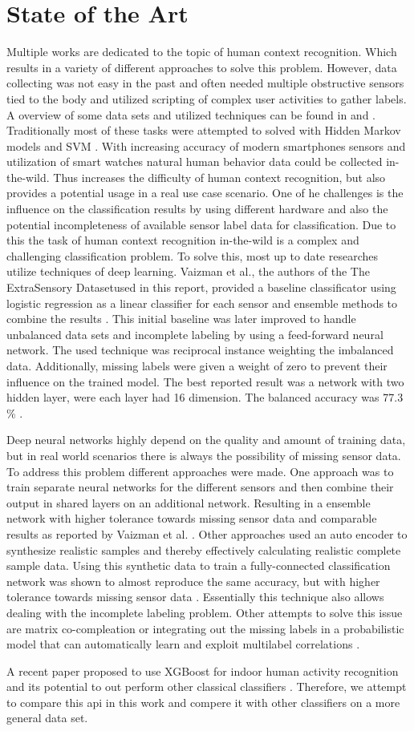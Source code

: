 \section{State of the Art}
Multiple works are dedicated to the topic of human context recognition. Which results in a variety of different approaches to solve this problem. However, data collecting was not easy in the past and often needed multiple obstructive sensors tied to the body and utilized scripting of complex user activities to gather labels. A overview of some data sets and utilized techniques can be found in \cite{Ramasamy18} and \cite{Lara13}. Traditionally most of these tasks were attempted to solved with Hidden Markov models \cite{Lee11} and SVM \cite{Anguita12}. 
With increasing accuracy of modern smartphones sensors and utilization of smart watches natural human behavior data could be collected in-the-wild. Thus increases the difficulty of human context recognition, but also provides a potential usage in a real use case scenario.  One of he challenges is the influence on the classification results by using different hardware \cite{Stisen15} and also the potential incompleteness of available sensor label data for classification. Due to this the task of human context recognition in-the-wild is a complex and challenging classification problem. 
To solve this, most up to date researches utilize techniques of deep learning. Vaizman et al., the authors of the \gl The ExtraSensory Dataset\gr  used in this report, provided a baseline classificator using logistic regression as a linear classifier for each sensor and ensemble methods to combine the results \cite{Vaizman17}. This initial baseline was later improved to handle unbalanced data sets and incomplete labeling by using a feed-forward neural network. The used technique was reciprocal instance weighting the imbalanced data. Additionally, missing labels were given a weight of zero to prevent their influence on the trained model. The best reported result was a network with two hidden layer, were each layer had 16 dimension. The balanced accuracy was 77.3 \% \cite{Vaizman18}. 

Deep neural networks highly depend on the quality and amount of training data, but in real world scenarios there is always the possibility of missing sensor data. To address this problem different approaches were made. One approach was to train separate neural networks for the different sensors and then combine their output in shared layers on an additional network. Resulting in a ensemble network with higher tolerance towards missing sensor data and comparable results as reported by Vaizman et al. \cite{Saeed18}. Other approaches used an auto encoder to synthesize realistic samples and thereby effectively calculating realistic complete sample data. Using this synthetic data to train a fully-connected classification network was shown to almost reproduce the same accuracy, but with higher tolerance towards missing sensor data \cite{Saeed18-2}. Essentially this technique also allows dealing with the incomplete labeling problem. Other attempts to solve this issue are matrix co-compleation \cite{Xu18} or integrating out the missing labels in a probabilistic model that can automatically learn and exploit multilabel correlations \cite{Bi14}.

A recent paper proposed to use XGBoost for indoor human activity recognition and its potential to out perform other classical classifiers \cite{Zhang19}. Therefore, we attempt to compare this api in this work and compere it with other classifiers on a more general data set. 
